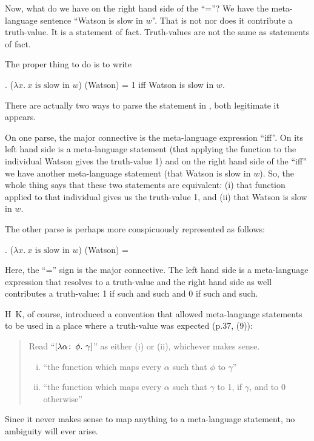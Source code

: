 Now, what do we have on the right hand side of the ``=''? We have the
meta-language sentence ``Watson is slow in $w$''. That is not nor does
it contribute a truth-value. It is a statement of fact. Truth-values
are not the same as statements of fact.

The proper thing to do is to write

\ex. ($\lambda x.\ x \mbox{ is slow in } w$) (Watson) = 1 iff Watson
is slow in $w$.\label{ex:goodwatson}

There are actually two ways to parse the statement in \Last, both
legitimate it appears.

On one parse, the major connective is the meta-language expression
``iff''. On its left hand side is a meta-language statement (that
applying the function to the individual Watson gives the truth-value
1) and on the right hand side of the ``iff'' we have another
meta-language statement (that Watson is slow in $w$). So, the whole
thing says that these two statements are equivalent: (i) that function
applied to that individual gives us the truth-value 1, and (ii) that
Watson is slow in $w$.

The other parse is perhaps more conspicuously represented as follows:

\ex. ($\lambda x.\ x \mbox{ is slow in } w$) (Watson) = 

Here, the ``='' sign is the major connective. The left hand side is a
meta-language expression that resolves to a truth-value and the right
hand side %
%
as well contributes a truth-value: 1 if such and such and 0 if such
and such.

H\amp\ K, of course, introduced a convention that allowed
meta-language statements to be used in a place where a truth-value was
expected (p.37, (9)):

\begin{quote}
  Read ``$[\lambda \alpha\co \phi.\ \gamma]$'' as either (i) or (ii),
  whichever makes sense.
  \begin{enumerate}[(i)]
  \item ``the function which maps every $\alpha$ such that $\phi$ to
    $\gamma$''
  \item ``the function which maps every $\alpha$ such that $\gamma$ to
    1, if $\gamma$, and to 0 otherwise''
  \end{enumerate}
\end{quote}
%
Since it never makes sense to map anything to a meta-language
statement, no ambiguity will ever arise.

